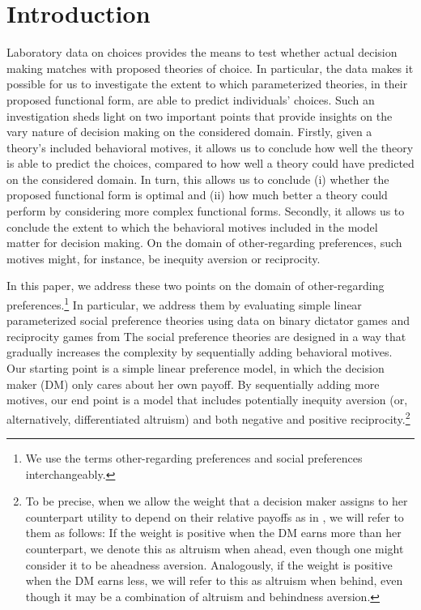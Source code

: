 \documentclass[11pt,a4paper]{article}
\theoremstyle{definition}
\begin{document}
\section{Introduction}
\label{sec:introduction}
Laboratory data on choices provides the means to test whether actual decision making matches with proposed theories of choice. In particular, the data makes it possible for us to investigate the extent to which parameterized theories, in their proposed functional form, are able to predict individuals' choices. Such an investigation sheds light on two important points that provide insights on the vary nature of decision making on the considered domain. Firstly, given a theory's included behavioral motives, it allows us to conclude how well the theory is able to predict the choices, compared to how well a theory could have predicted on the considered domain. In turn, this allows us to conclude (i) whether the proposed functional form is optimal and (ii) how much better a theory could perform by considering more complex functional forms. Secondly, it allows us to conclude the extent to which the behavioral motives included in the model matter for decision making. On the domain of other-regarding preferences, such motives might, for instance, be inequity aversion or reciprocity.

In this paper, we address these two points on the domain of other-regarding preferences.\footnote{We use the terms other-regarding preferences and social preferences interchangeably.}  In particular, we address them by evaluating simple linear parameterized social preference theories using data on binary dictator games and reciprocity games from \cite{Bruhin2019} The social preference theories are designed in a way that gradually increases the complexity by sequentially adding behavioral motives. Our starting point is a simple linear preference model, in which the decision maker (DM) only cares about her own payoff. By sequentially adding more motives, our end point is a model that includes potentially inequity aversion (or, alternatively, differentiated altruism) and both negative and positive reciprocity.\footnote{To be precise, when we allow the weight that a decision maker assigns to her counterpart utility to depend on their relative payoffs as in \cite{Fehr1999}, we will refer to them as follows: If the weight is positive when the DM earns more than her counterpart, we denote this as altruism when ahead, even though one might consider it to be aheadness aversion. Analogously, if the weight is positive when the DM earns less, we will refer to this as altruism when behind, even though it may be a combination of altruism and behindness aversion.}
\end{document}

